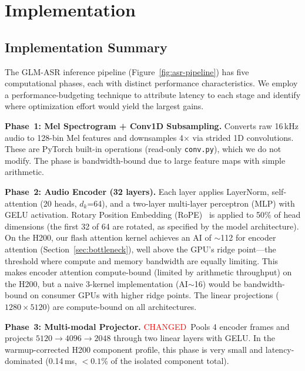 \documentclass{article}
\newcommand{\chg}[1]{{\color{blue}#1}}
\newcommand{\chglabel}{{\setlength{\fboxsep}{1pt}\colorbox{yellow!45}{\textcolor{red}{\scriptsize CHANGED}}}}
\begin{document}
\section{Implementation}\label{sec:implementation}

\subsection{Implementation Summary}

The GLM-ASR inference pipeline (Figure~\ref{fig:asr-pipeline}) has five computational phases, each with distinct performance characteristics.
We employ a performance-budgeting technique to attribute latency to each stage and identify where optimization effort would yield the largest gains.

\textbf{Phase~1: Mel Spectrogram + Conv1D Subsampling.}
Converts raw 16\,kHz audio to 128-bin Mel features and downsamples 4$\times$ via strided 1D convolutions.  These are PyTorch built-in operations (read-only \texttt{conv.py}), which we do not modify.  The phase is bandwidth-bound due to large feature maps with simple arithmetic.

\textbf{Phase~2: Audio Encoder (32 layers).}
Each layer applies LayerNorm, self-attention (20 heads, $d_k$=64), and a two-layer multi-layer perceptron (MLP) with GELU activation.  Rotary Position Embedding (RoPE)~\citep{su2024roformer} is applied to 50\% of head dimensions (the first 32 of 64 are rotated, as specified by the model architecture).  On the H200, our flash attention kernel achieves an AI of $\sim$112 for encoder attention (Section~\ref{sec:bottleneck}), well above the GPU's ridge point---the threshold where compute and memory bandwidth are equally limiting.  This makes encoder attention compute-bound (limited by arithmetic throughput) on the H200, but a naive 3-kernel implementation (AI$\sim$16) would be bandwidth-bound on consumer GPUs with higher ridge points.  The linear projections ($1280 \times 5120$) are compute-bound on all architectures.

\textbf{Phase~3: Multi-modal Projector.}
\chglabel\ \chg{Pools 4 encoder frames and projects $5120 \to 4096 \to 2048$ through two linear layers with GELU.  In the warmup-corrected H200 component profile, this phase is very small and latency-dominated (0.14\,ms, $<0.1$\% of the isolated component total).}
\end{document}
